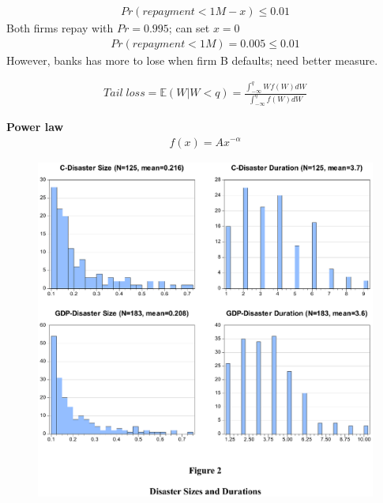 \documentclass{beamer}
\begin{document}
\begin{frame}
 \begin{align}
   Pr(repayment < 1M-x)\leq 0.01
 \end{align}
 Both firms repay with $Pr=0.995$; can set $x=0$
 \begin{align}
   Pr(repayment < 1M)=0.005 \leq 0.01
 \end{align}
 However, banks has more to lose when firm B defaults; need better measure.
\end{frame}

\begin{frame}
  \begin{align}
    Tail\;loss = \mathbb{E}(W|W<q) = \frac{\int^q_{-\infty}Wf(W)dW}{\int^q_{-\infty}f(W)dW}
  \end{align}
\end{frame}

\begin{frame}
  \textbf{Power law}
  \begin{align}
    f(x)=Ax^{-\alpha}
  \end{align}
\end{frame}

\begin{frame}
  \begin{figure}
    \includegraphics{barro.eps}
  \end{figure}
\end{frame}
\end{document}
